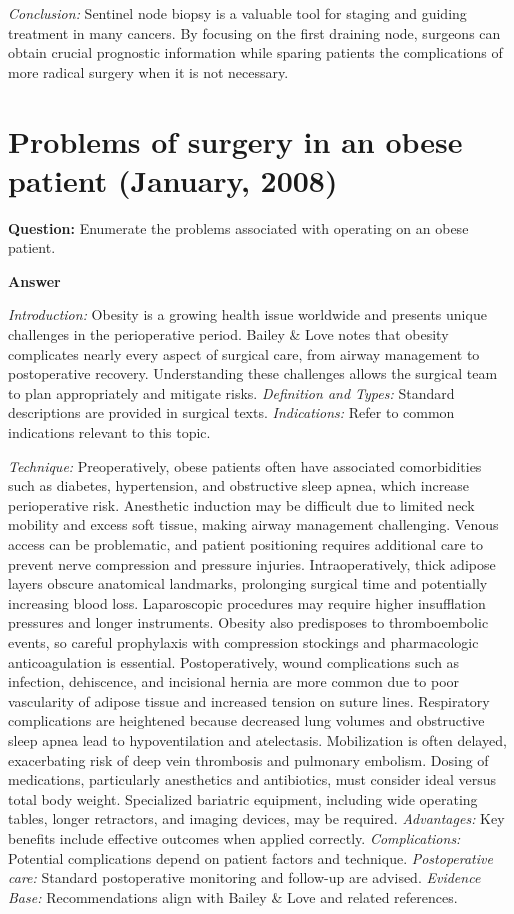 \documentclass{article}
\begin{document}
\emph{Conclusion:} Sentinel node biopsy is a valuable tool for staging and guiding treatment in many cancers. By focusing on the first draining node, surgeons can obtain crucial prognostic information while sparing patients the complications of more radical surgery when it is not necessary.


\section{Problems of surgery in an obese patient (January, 2008)}

\textbf{Question:} Enumerate the problems associated with operating on an obese patient.

\textbf{Answer}

\emph{Introduction:} Obesity is a growing health issue worldwide and presents unique challenges in the perioperative period. Bailey & Love notes that obesity complicates nearly every aspect of surgical care, from airway management to postoperative recovery. Understanding these challenges allows the surgical team to plan appropriately and mitigate risks.
\emph{Definition and Types:} Standard descriptions are provided in surgical texts.
\emph{Indications:} Refer to common indications relevant to this topic.

\emph{Technique:} Preoperatively, obese patients often have associated comorbidities such as diabetes, hypertension, and obstructive sleep apnea, which increase perioperative risk. Anesthetic induction may be difficult due to limited neck mobility and excess soft tissue, making airway management challenging. Venous access can be problematic, and patient positioning requires additional care to prevent nerve compression and pressure injuries. Intraoperatively, thick adipose layers obscure anatomical landmarks, prolonging surgical time and potentially increasing blood loss. Laparoscopic procedures may require higher insufflation pressures and longer instruments. Obesity also predisposes to thromboembolic events, so careful prophylaxis with compression stockings and pharmacologic anticoagulation is essential. Postoperatively, wound complications such as infection, dehiscence, and incisional hernia are more common due to poor vascularity of adipose tissue and increased tension on suture lines. Respiratory complications are heightened because decreased lung volumes and obstructive sleep apnea lead to hypoventilation and atelectasis. Mobilization is often delayed, exacerbating risk of deep vein thrombosis and pulmonary embolism. Dosing of medications, particularly anesthetics and antibiotics, must consider ideal versus total body weight. Specialized bariatric equipment, including wide operating tables, longer retractors, and imaging devices, may be required.
\emph{Advantages:} Key benefits include effective outcomes when applied correctly.
\emph{Complications:} Potential complications depend on patient factors and technique.
\emph{Postoperative care:} Standard postoperative monitoring and follow-up are advised.
\emph{Evidence Base:} Recommendations align with Bailey & Love and related references.
\end{document}
